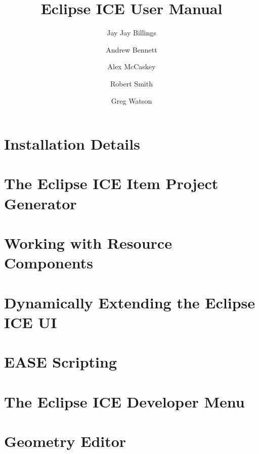 \documentclass{report}
\begin{document}
\title{Eclipse ICE User Manual}
\author{Jay Jay Billings}
\author{Andrew Bennett}
\author{Alex McCaskey}
\author{Robert Smith}
\author{Greg Watson}
\maketitle{}

\chapter{Installation Details}
\graphicspath{{../../installation/src/}}


\chapter{The Eclipse ICE Item Project Generator}
\graphicspath{{../../newItemGeneration/src/}}


\chapter{Working with Resource Components}
\graphicspath{{../../resourceComponents/src/}}


\chapter{Dynamically Extending the Eclipse ICE UI}
\graphicspath{{../../dynamicUI/src/}}


\chapter{EASE Scripting}
\graphicspath{{../../scripting/src/}}
\lstset{inputpath=../../scripting/src/}


\chapter{The Eclipse ICE Developer Menu}
\graphicspath{{../../developerMenu/src/}}


\chapter{Geometry Editor}
\graphicspath{{../../geometryEditor/src/}}

\end{document}
